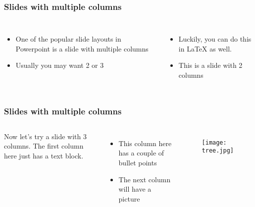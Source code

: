 \documentclass{beamer}
\begin{document}
\begin{frame}
\frametitle{Slides with multiple columns}

\begin{columns}

\begin{itemize}
\item<1-> One of the popular slide layouts in Powerpoint is a slide with multiple columns 
\item<2-> Usually you may want 2 or 3 
\end{itemize}

\begin{itemize}
    \item<3-> Luckily, you can do this in \LaTeX \hspace{.05cm} as well.
    \item<4-> This is a slide with 2 columns
\end{itemize}
\end{columns}
\end{frame}






\begin{frame}
\frametitle{Slides with multiple columns}

\begin{columns}

Now let's try a slide with 3 columns. The first column here just has a text block. \pause

\begin{itemize}
    \item<2-> This column here has a couple of bullet points \pause
    \item<3-> The next column will have a picture \pause
\end{itemize}

\begin{figure}[h]
    \centering
    \texttt{[image: tree.jpg]}
\end{figure}

\end{columns}
\end{frame}

\end{document}
